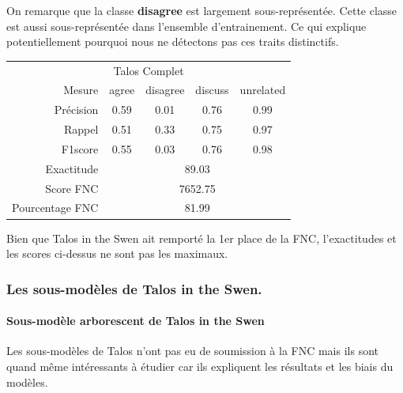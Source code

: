 \documentclass[11pt,a4paper,oldfontcommands]{memoir}
\begin{document}
On remarque que la classe \textbf{disagree} est largement sous-représentée. Cette classe est aussi sous-représentée dans l'ensemble d'entrainement. Ce qui explique potentiellement pourquoi nous ne détectons pas ces traits distinctifs.
\begin{center}
 \begin{tabular}{ r | c c c c }
  \multicolumn{5}{c}{Talos Complet}                                              \\
  Mesure          & agree                       & disagree & discuss & unrelated \\
  \hline
  Précision       & 0.59                        & 0.01     & 0.76    & 0.99      \\
  Rappel          & 0.51                        & 0.33     & 0.75    & 0.97      \\
  F1score         & 0.55                        & 0.03     & 0.76    & 0.98      \\
  \hline
  \hline
  Exactitude      & \multicolumn{4}{c}{89.03}                                    \\
  Score FNC       & \multicolumn{4}{c}{7652.75}                                  \\
  Pourcentage FNC & \multicolumn{4}{c}{81.99}                                    \\
 \end{tabular}
\end{center}

Bien que Talos in the Swen ait remporté la 1er place de la FNC, l'exactitudes et les scores ci-dessus ne sont pas les maximaux.



\subsubsection{Les sous-modèles de Talos in the Swen.}
\paragraph{Sous-modèle arborescent de Talos in the Swen}
Les sous-modèles de Talos n'ont pas eu de soumission à la FNC mais ils sont quand même intéressants à étudier car ils expliquent les résultats et les biais du modèles.
\end{document}

